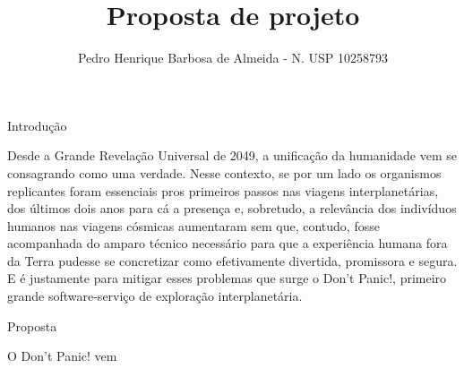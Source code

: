 \documentclass[12pt]{exam}
\title{Proposta de projeto}
\author{Pedro Henrique Barbosa de Almeida - N. USP 10258793}
\date{}
\begin{document}
	\clearpage
	\pagestyle{plain}
	\maketitle
	
	Introdução
	
	Desde a Grande Revelação Universal de 2049, a unificação da humanidade vem se consagrando como uma verdade. Nesse contexto, se por um lado os organismos replicantes foram essenciais pros primeiros passos nas viagens interplanetárias, dos últimos dois anos para cá a presença e, sobretudo, a relevância dos indivíduos humanos nas viagens cósmicas aumentaram sem que, contudo, fosse acompanhada do amparo técnico necessário para que a experiência humana fora da Terra pudesse se concretizar como efetivamente divertida, promissora e segura. E é justamente para mitigar esses problemas que surge o Don't Panic!, primeiro grande software-serviço de exploração interplanetária. 
	
	Proposta
	
	O Don't Panic! vem 
	 
	
	
	
\end{document}
